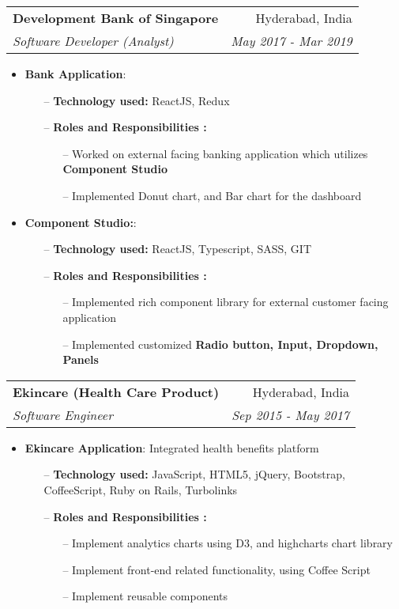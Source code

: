 \documentclass[letterpaper,10pt]{article}
\makeatletter
\newcommand{\resumeItem}[2]{
  \item\small{
    \textbf{#1}{: #2 \vspace{-2pt}}
  }
}
\newcommand{\resumeSubheading}[4]{
  \vspace{-1pt}\item
    \begin{tabular*}{0.97\textwidth}[t]{l@{\extracolsep{\fill}}r}
      \textbf{#1} & #2 \\
      \textit{\small#3} & \textit{\small #4} \\
    \end{tabular*}\vspace{-5pt}
}
\newcommand{\resumeItemListStart}{\begin{itemize}}
\newcommand{\resumeItemListEnd}{\end{itemize}\vspace{-5pt}}
\makeatother
\begin{document}
\resumeSubheading
{Development Bank of Singapore}{Hyderabad, India}
{Software Developer (Analyst)}{May 2017 - Mar 2019}
\resumeItemListStart
\resumeItem{Bank Application}{}
\begin{itemize}
  \item [--] \textbf{Technology used:} ReactJS, Redux
  \item [--] \textbf{Roles and Responsibilities :}
  \begin{itemize}
    \item [--] Worked on external facing banking application which utilizes \textbf{Component Studio}
    \item [--] Implemented Donut chart, and Bar chart for the dashboard
  \end{itemize}
\end{itemize}

\resumeItem{Component Studio:}{}
\begin{itemize}
  \item [--] \textbf{Technology used:} ReactJS, Typescript, SASS, GIT
  \item [--] \textbf{Roles and Responsibilities :}
  \begin{itemize}
    \item [--] Implemented rich component library for external customer facing application
    \item [--] Implemented customized \textbf{Radio button, Input, Dropdown, Panels}
  \end{itemize}
\end{itemize}
\resumeItemListEnd

\resumeSubheading
{Ekincare (Health Care Product)}{Hyderabad, India}
{Software Engineer}{Sep 2015 - May 2017}
\resumeItemListStart
\resumeItem{Ekincare Application}
{Integrated health benefits platform}
\begin{itemize}
  \item [--] \textbf{Technology used:} JavaScript, HTML5, jQuery, Bootstrap, CoffeeScript, Ruby on Rails, Turbolinks
  \item [--] \textbf{Roles and Responsibilities :}
  \begin{itemize}
    \item [--] Implement analytics charts using D3, and highcharts chart library
    \item [--] Implement front-end related functionality, using Coffee Script
    \item [--] Implement reusable components
  \end{itemize}
\end{itemize}
\resumeItemListEnd
\end{document}
